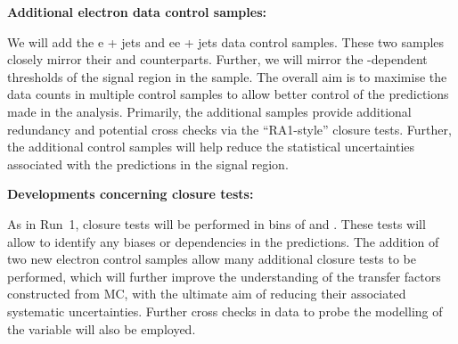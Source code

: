 {\bf Additional electron data control samples:}

We will add the e + jets and ee + jets data control samples. These two
samples closely mirror their \mj and \mmj counterparts. Further, we
will mirror the \scalht-dependent \alphat thresholds of the signal
region in the \gj sample. The overall aim is to maximise the data
counts in multiple control samples to allow better control of the
predictions made in the analysis. Primarily, the additional samples
provide additional redundancy and potential cross checks via the
``RA1-style'' closure tests. Further, the additional control samples
will help reduce the statistical uncertainties associated with the
predictions in the signal region.

{\bf Developments concerning closure tests:}

As in Run~1, closure tests will be performed in bins of \njet and
\scalht. These tests will allow to identify any biases or dependencies
in the predictions. The addition of two new electron control samples
allow many additional closure tests to be performed, which will
further improve the understanding of the transfer factors constructed
from MC, with the ultimate aim of reducing their associated systematic
uncertainties. Further cross checks in data to probe the modelling of
the \mht variable will also be employed.

